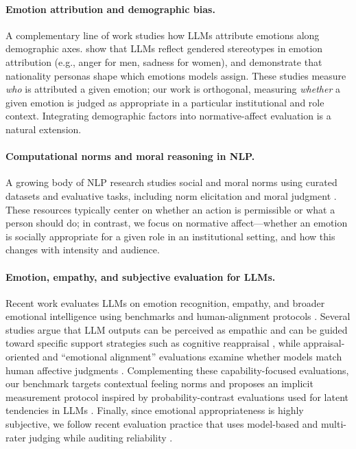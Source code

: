 \documentclass[11pt]{article}
\begin{document}
\paragraph{Emotion attribution and demographic bias.}
A complementary line of work studies how LLMs attribute emotions along demographic axes.
\citet{plaza-del-arco-etal-2024-angry-men} show that LLMs reflect gendered stereotypes in emotion attribution (e.g., anger for men, sadness for women), and \citet{kovacs-etal-2025-anger-joy} demonstrate that nationality personas shape which emotions models assign.
These studies measure \emph{who} is attributed a given emotion; our work is orthogonal, measuring \emph{whether} a given emotion is judged as appropriate in a particular institutional and role context.
Integrating demographic factors into normative-affect evaluation is a natural extension.

\paragraph{Computational norms and moral reasoning in NLP.}
A growing body of NLP research studies social and moral norms using curated datasets and evaluative tasks, including norm elicitation and moral judgment \cite{forbes-etal-2020-social,emelin-etal-2021-moral,ziems-etal-2023-normbank,hendrycks2021ethics,jiang2021delphi}. These resources typically center on whether an action is permissible or what a person should do; in contrast, we focus on normative affect---whether an emotion is socially appropriate for a given role in an institutional setting, and how this changes with intensity and audience.

\paragraph{Emotion, empathy, and subjective evaluation for LLMs.}
Recent work evaluates LLMs on emotion recognition, empathy, and broader emotional intelligence using benchmarks and human-alignment protocols \cite{demszky-etal-2020-goemotions,rashkin-etal-2019-towards,sabour-etal-2024-emobench,chen-etal-2024-emotionqueen,paech2023eqbench,liu-etal-2025-longemotion}. Several studies argue that LLM outputs can be perceived as empathic and can be guided toward specific support strategies such as cognitive reappraisal \cite{lee-etal-2024-empathic,lee-etal-2023-chain-of-empathy,zhan-etal-2024-reappraisal,luo-etal-2024-emrank,chen-etal-2025-synthempathy}, while appraisal-oriented and ``emotional alignment'' evaluations examine whether models match human affective judgments \cite{zhan-etal-2023-evaluating,huang-etal-2024-apathetic}. Complementing these capability-focused evaluations, our benchmark targets contextual feeling norms and proposes an implicit measurement protocol inspired by probability-contrast evaluations used for latent tendencies in LLMs \cite{nangia-etal-2020-crows,nadeem-etal-2021-stereoset}. Finally, since emotional appropriateness is highly subjective, we follow recent evaluation practice that uses model-based and multi-rater judging while auditing reliability \cite{zheng2023mtbench,zhao-etal-2025-lmc}.
\end{document}
